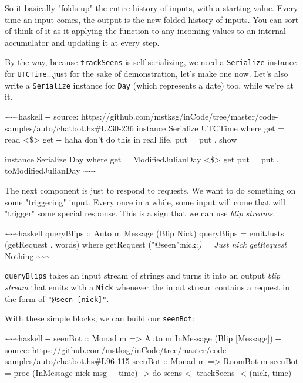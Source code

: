 \documentclass[]{article}
\begin{document}
So it basically "folds up" the entire history of inputs, with a starting value.
Every time an input comes, the output is the new folded history of inputs. You
can sort of think of it as it applying the function to any incoming values to an
internal accumulator and updating it at every step.

By the way, because \texttt{trackSeens} is self-serializing, we need a
\texttt{Serialize} instance for \texttt{UTCTime}...just for the sake of
demonstration, let's make one now. Let's also write a \texttt{Serialize}
instance for \texttt{Day} (which represents a date) too, while we're at it.

\textasciitilde{}\textasciitilde{}\textasciitilde{}haskell -\/- source:
https://github.com/mstksg/inCode/tree/master/code-samples/auto/chatbot.hs\#L230-236
instance Serialize UTCTime where get = read \textless{}\$\textgreater{} get -\/-
haha don't do this in real life. put = put . show

instance Serialize Day where get = ModifiedJulianDay \textless{}\$\textgreater{}
get put = put . toModifiedJulianDay
\textasciitilde{}\textasciitilde{}\textasciitilde{}

The next component is just to respond to requests. We want to do something on
some "triggering" input. Every once in a while, some input will come that will
"trigger" some special response. This is a sign that we can use \emph{blip
streams}.

\textasciitilde{}\textasciitilde{}\textasciitilde{}haskell queryBlips :: Auto m
Message (Blip Nick) queryBlips = emitJusts (getRequest . words) where getRequest
("@seen":nick:\emph{) = Just nick getRequest } = Nothing
\textasciitilde{}\textasciitilde{}\textasciitilde{}

\texttt{queryBlips} takes an input stream of strings and turns it into an output
\emph{blip stream} that emits with a \texttt{Nick} whenever the input stream
contains a request in the form of \texttt{"@seen\ {[}nick{]}"}.

With these simple blocks, we can build our \texttt{seenBot}:

\textasciitilde{}\textasciitilde{}\textasciitilde{}haskell -\/- seenBot :: Monad
m =\textgreater{} Auto m InMessage (Blip {[}Message{]}) -\/- source:
https://github.com/mstksg/inCode/tree/master/code-samples/auto/chatbot.hs\#L96-115
seenBot :: Monad m =\textgreater{} RoomBot m seenBot = proc (InMessage nick msg
\_ time) -\textgreater{} do seens \textless{}- trackSeens -\textless{} (nick,
time)
\end{document}
